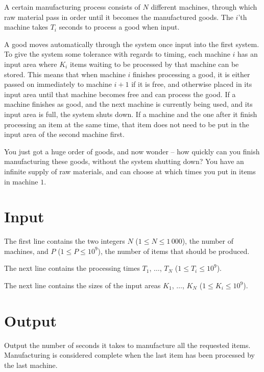 A certain manufacturing process consists of $N$ different machines, through which raw material pass in order until it becomes the manufactured goods.
The $i$'th machine takes $T_i$ seconds to process a good when input.

A good moves automatically through the system once input into the first system.
To give the system some tolerance with regards to timing, each machine $i$ has an input area where $K_i$ items waiting to be processed by that machine can be stored.
This means that when machine $i$ finishes processing a good, it is either passed on immediately to machine $i + 1$ if it is free, and otherwise placed in its input area until that machine becomes free and can process the good.
If a machine finishes as good, and the next machine is currently being used, and its input area is full, the system shuts down.
If a machine and the one after it finish processing an item at the same time, that item does not need to be put in the input area of the second machine first.

You just got a huge order of goods, and now wonder -- how quickly can you finish manufacturing these goods, without the system shutting down?
You have an infinite supply of raw materials, and can choose at which times you put in items in machine $1$.

\section*{Input}
The first line contains the two integers $N$ ($1 \le N \le 1\,000$), the number of machines, and $P$ ($1 \le P \le 10^9$), the number of items that should be produced.

The next line contains the processing times $T_1$, $\dots$, $T_N$ ($1 \le T_i \le 10^9$).

The next line contains the sizes of the input areas $K_1$, $\dots$, $K_N$ ($1 \le K_i \le 10^9$).

\section*{Output}
Output the number of seconds it takes to manufacture all the requested items.
Manufacturing is considered complete when the last item has been processed by the last machine.

